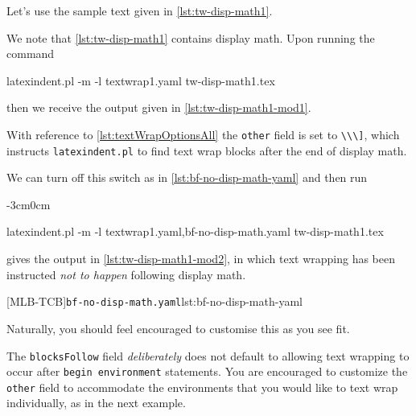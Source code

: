 \documentclass[10pt]{article}
\newenvironment{widepage}{\begin{adjustwidth}{-3cm}{0cm}}{\end{adjustwidth}}
\begin{document}
 \begin{example}
 Let's use the sample text given in \cref{lst:tw-disp-math1}.  


 We note that \cref{lst:tw-disp-math1} contains display math. Upon running the command

 \begin{commandshell}
latexindent.pl -m -l textwrap1.yaml tw-disp-math1.tex
\end{commandshell}

 then we receive the output given in \cref{lst:tw-disp-math1-mod1}.


 With reference to \vref{lst:textWrapOptionsAll} the \texttt{other} field is set to
 \lstinline!\\\]!, which instructs \texttt{latexindent.pl} to find text wrap blocks after
 the end of display math.

 We can turn off this switch as in \cref{lst:bf-no-disp-math-yaml} and then run
 \begin{widepage}

  \begin{commandshell}
latexindent.pl -m -l textwrap1.yaml,bf-no-disp-math.yaml tw-disp-math1.tex
\end{commandshell}

 \end{widepage}
 gives the output in \cref{lst:tw-disp-math1-mod2}, in which text wrapping has been
 instructed \emph{not to happen} following display math.
 \begin{cmhtcbraster}[raster column skip=.1\linewidth]
  [MLB-TCB]{\texttt{bf-no-disp-math.yaml}}{lst:bf-no-disp-math-yaml}
 \end{cmhtcbraster}

 Naturally, you should feel encouraged to customise this as you see fit.
 \end{example}

 The \texttt{blocksFollow} field \emph{deliberately} does not default to allowing text
 wrapping to occur after \texttt{begin environment} statements. You are encouraged to
 customize the \texttt{other} field to accommodate the environments that you would like
 to text wrap individually, as in the next example.
\end{document}

